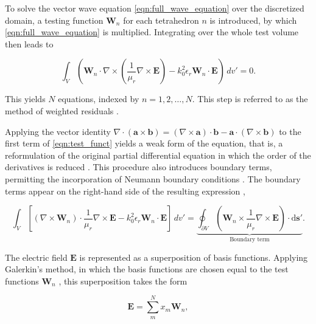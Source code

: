 To solve the vector wave equation \eqref{eqn:full_wave_equation} over 
the discretized domain, a testing function $\mathbf{W}_n$ for each tetrahedron $n$ is introduced, 
by which \eqref{eqn:full_wave_equation} is multiplied. Integrating over the whole test volume then leads to \cite{kopp_hfss}

\begin{equation}
	\int_V\left( \mathbf{W}_n\cdot\nabla \times\left( \frac{1}{\mu_r}\nabla\times\mathbf{E} \right)-k_0^2\epsilon_r\mathbf{W}_n\cdot\mathbf{E} \right)\,dv'=0.
	\label{eqn:test_funct}
\end{equation}

This yields $N$ equations, indexed by $n=1,2,\ldots,N$. This step is referred to as the method of weighted residuals \cite{Mohsen_1982}.

Applying the vector identity $\nabla\cdot\left(\mathbf{a}\times\mathbf{b}\right)=\left(\nabla\times\mathbf{a}\right)\cdot\mathbf{b}-\mathbf{a}\cdot\left(\nabla\times\mathbf{b}\right)$ to the first term of \eqref{eqn:test_funct} yields a weak form of the equation, that is, a reformulation of the original partial differential equation in which the order of the derivatives is reduced \cite{Cendes_Lee_1988,huebner2001finite}. This procedure also introduces boundary terms, permitting the incorporation of Neumann boundary conditions \cite{Mohsen_1982}. The boundary terms appear on the right-hand side of the resulting expression \cite{kopp_hfss},

\begin{equation}
	\int_V \left[ \left(\nabla \times \mathbf{W}_n \right)\cdot \frac{1}{\mu_r}\nabla\times \mathbf{E}-k_0^2\epsilon_r\mathbf{W}_n\cdot\mathbf{E}\right]\,dv'=\underbrace{\oint_{\partial V}\left( \mathbf{W}_n\times \frac{1}{\mu_r}\nabla\times\mathbf{E}\right)\cdot\mathrm{d}\mathbf{s'}}_{\text{Boundary term}}.
	\label{eqn:greens_theorem_wave_eqn}
\end{equation}

The electric field $\mathbf{E}$ is represented as a superposition of basis functions. Applying Galerkin's method, in which the basis functions are chosen equal to the test functions $\mathbf{W}_n$ \cite{Mohsen_1982}, this superposition takes the form \cite{kopp_hfss}

\begin{equation}
	\mathbf{E}=\sum^N_m x_m\mathbf{W}_n,
	\label{eqn:representation_e_field_fem}
\end{equation}

